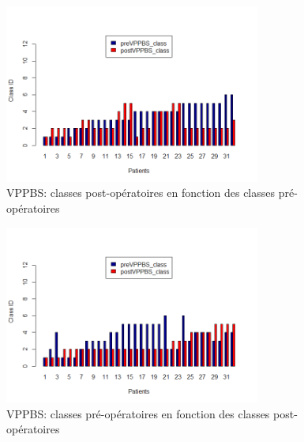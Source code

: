 \begin{figure}[H]
\centering
\includegraphics[width=0.75\textwidth]{../Fig/VPPBS/vppbs-histogram-pre-post.png}
\caption{VPPBS: classes post-opératoires en fonction des classes pré-opératoires}
\label{fig-vppbs-histogramFi	}
\end{figure}

\begin{figure}[H]
\centering
\includegraphics[width=0.75\textwidth]{../Fig/VPPBS/vppbs-histogram-post-pre.png}
\caption{VPPBS: classes pré-opératoires en fonction des classes post-opératoires}
\label{fig-vppbs-histogramFi	}
\end{figure}
